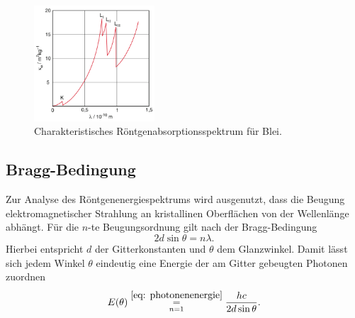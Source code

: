 \begin{figure}[H]
  \centering
  \includegraphics[width = 0.4\textwidth]{pics/absorption.png}
  \caption{Charakteristisches Röntgenabsorptionsspektrum für Blei\cite{dem}.}
  \label{fig: absorption}
\end{figure}

\subsection{Bragg-Bedingung}
Zur Analyse des Röntgenenergiespektrums wird ausgenutzt, dass die Beugung elektromagnetischer Strahlung an kristallinen
Oberflächen von der Wellenlänge abhängt. Für die $n$-te Beugungsordnung gilt nach der Bragg-Bedingung
\begin{equation}
  2 d \sin\theta = n \lambda.
  \label{eq: bragg}
\end{equation}
Hierbei entspricht $d$ der Gitterkonstanten und $\theta$ dem Glanzwinkel. Damit lässt sich jedem Winkel $\theta$ eindeutig eine
Energie der am Gitter gebeugten Photonen zuordnen
\begin{equation}
  E(\theta) \overset{\eqref{eq: photonenenergie} }{\underset{n = 1}{=}} \frac{h c}{2 d \sin \theta}.
  \label{eq: E_beugungswinkel}
\end{equation}
